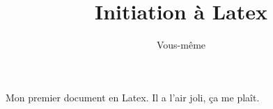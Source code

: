 \documentclass[10pt,a4paper]{report} %
\title{Initiation à Latex}
\author{Vous-même}
\begin{document}
\maketitle
Mon premier document en Latex. Il a l'air joli, ça me plaît.
\end{document}
